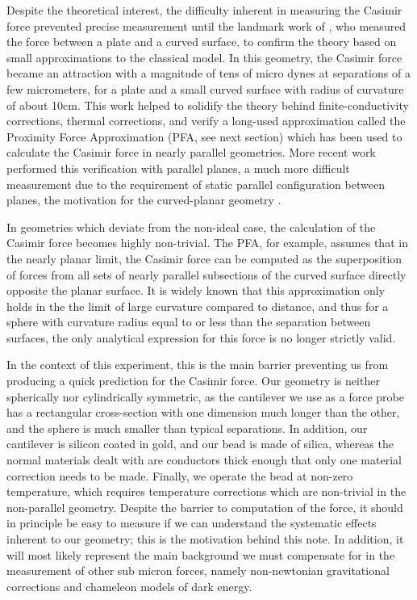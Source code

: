\documentclass[11pt,traditabstract]{article}
\begin{document}
Despite the theoretical interest, the difficulty inherent in measuring the Casimir force prevented precise measurement until the landmark work of \citet{Lamoreaux}, who measured the force between a plate and a curved surface, to confirm the theory based on small approximations to the classical model. In this geometry, the Casimir force became an attraction with a magnitude of tens of micro dynes at separations of a few micrometers, for a plate and a small curved surface with radius of curvature of about 10cm. This work helped to solidify the theory behind finite-conductivity corrections, thermal corrections, and verify a long-used approximation called the Proximity Force Approximation (PFA, see next section) which has been used to calculate the Casimir force in nearly parallel geometries. More recent work performed this verification with parallel planes, a much more difficult measurement due to the requirement of static parallel configuration between planes, the motivation for the curved-planar geometry \citep{rodr}.

In geometries which deviate from the non-ideal case, the calculation of the Casimir force becomes highly non-trivial. The PFA, for example, assumes that in the nearly planar limit, the Casimir force can be computed as the superposition of forces from all sets of nearly parallel subsections of the curved surface directly opposite the planar surface. It is widely known that this approximation only holds in the the limit of large curvature compared to distance, and thus for a sphere with curvature radius equal to or less than the separation between surfaces, the only analytical expression for this force is no longer strictly valid.

In the context of this experiment, this is the main barrier preventing us from producing a quick prediction for the Casimir force. Our geometry is neither spherically nor cylindrically symmetric, as the cantilever we use as a force probe has a rectangular cross-section with one dimension much longer than the other, and the sphere is much smaller than typical separations. In addition, our cantilever is silicon coated in gold, and our bead is made of silica, whereas the normal materials dealt with are conductors thick enough that only one material correction needs to be made. Finally, we operate the bead at non-zero temperature, which requires temperature corrections which are non-trivial in the non-parallel geometry. Despite the barrier to computation of the force, it should in principle be easy to measure if we can understand the systematic effects inherent to our geometry; this is the motivation behind this note. In addition, it will most likely represent the main background we must compensate for in the measurement of other sub micron forces, namely non-newtonian gravitational corrections and chameleon models of dark energy.
\end{document}
